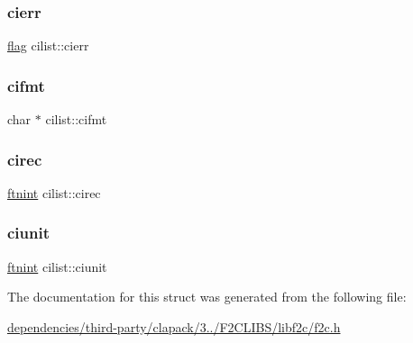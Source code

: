 \mbox{\label{structcilist_aaa609be8bdf78a8fc7ba35b2ed0e6083}} 
\subsubsection{\texorpdfstring{cierr}{cierr}}
{\footnotesize\ttfamily \hyperlink{dependencies_2third-party_2clapack_23_82_81_2_f2_c_l_i_b_s_2libf2c_2f2c_8h_abf5d144da384425ae6cb542ce6eec8d3}{flag} cilist\+::cierr}

\mbox{\label{structcilist_afe080061de3f246df08a10b1e1cbdd46}} 
\subsubsection{\texorpdfstring{cifmt}{cifmt}}
{\footnotesize\ttfamily char $\ast$ cilist\+::cifmt}

\mbox{\label{structcilist_ace7c117f446a91e75e9f920fcff86546}} 
\subsubsection{\texorpdfstring{cirec}{cirec}}
{\footnotesize\ttfamily \hyperlink{dependencies_2third-party_2clapack_23_82_81_2_f2_c_l_i_b_s_2libf2c_2f2c_8h_a9d70cdb573fb2bf020e1f6dba85fb1cc}{ftnint} cilist\+::cirec}

\mbox{\label{structcilist_a3e5d0438673d14f5889fb6a3e712a076}} 
\subsubsection{\texorpdfstring{ciunit}{ciunit}}
{\footnotesize\ttfamily \hyperlink{dependencies_2third-party_2clapack_23_82_81_2_f2_c_l_i_b_s_2libf2c_2f2c_8h_a9d70cdb573fb2bf020e1f6dba85fb1cc}{ftnint} cilist\+::ciunit}



The documentation for this struct was generated from the following file\+:\begin{DoxyCompactItemize}
\item 
\hyperlink{dependencies_2third-party_2clapack_23_82_81_2_f2_c_l_i_b_s_2libf2c_2f2c_8h}{dependencies/third-\/party/clapack/3../\+F2\+C\+L\+I\+B\+S/libf2c/f2c.\+h}\end{DoxyCompactItemize}
